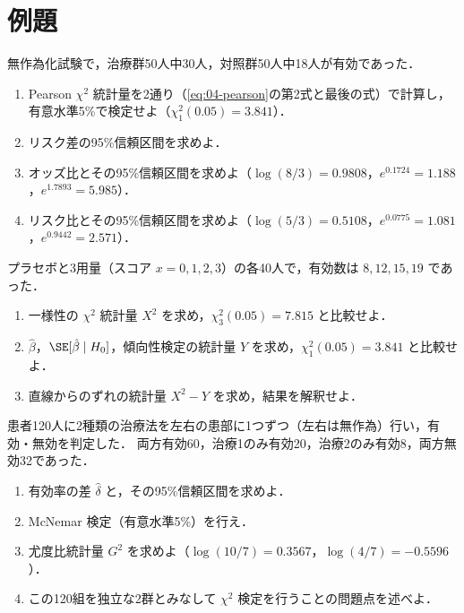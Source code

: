 \section{例題}\label{sec:04-ex}
\begin{reidai}\label{reidai:04-1}
無作為化試験で，治療群50人中30人，対照群50人中18人が有効であった．
\begin{enumerate}[label=(\arabic*)]
\item Pearson $\chi^2$ 統計量を2通り（\cref{eq:04-pearson}の第2式と最後の式）で計算し，有意水準5\%で検定せよ（$\chi^2_1(0.05)=3.841$）．
\item リスク差の95\%信頼区間を求めよ．
\item オッズ比とその95\%信頼区間を求めよ（$\log(8/3)=0.9808$，$e^{0.1724}=1.188$，$e^{1.7893}=5.985$）．
\item リスク比とその95\%信頼区間を求めよ（$\log(5/3)=0.5108$，$e^{0.0775}=1.081$，$e^{0.9442}=2.571$）．
\end{enumerate}
\end{reidai}

\begin{reidai}[一様性と傾向性]\label{reidai:04-2}
プラセボと3用量（スコア $x=0,1,2,3$）の各40人で，有効数は $8,12,15,19$ であった．
\begin{enumerate}[label=(\arabic*)]
\item 一様性の $\chi^2$ 統計量 $X^2$ を求め，$\chi^2_3(0.05)=7.815$ と比較せよ．
\item $\hat\beta$，$\SE[\hat\beta\mid H_0]$，傾向性検定の統計量 $Y$ を求め，$\chi^2_1(0.05)=3.841$ と比較せよ．
\item 直線からのずれの統計量 $X^2-Y$ を求め，結果を解釈せよ．
\end{enumerate}
\end{reidai}

\begin{reidai}[McNemar]\label{reidai:04-3}
患者120人に2種類の治療法を左右の患部に1つずつ（左右は無作為）行い，有効・無効を判定した．
両方有効60，治療1のみ有効20，治療2のみ有効8，両方無効32であった．
\begin{enumerate}[label=(\arabic*)]
\item 有効率の差 $\hat\delta$ と，その95\%信頼区間を求めよ．
\item McNemar 検定（有意水準5\%）を行え．
\item 尤度比統計量 $G^2$ を求めよ（$\log(10/7)=0.3567$，$\log(4/7)=-0.5596$）．
\item この120組を独立な2群とみなして $\chi^2$ 検定を行うことの問題点を述べよ．
\end{enumerate}
\end{reidai}

